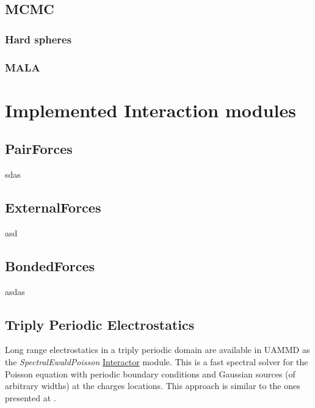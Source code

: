\documentclass[ twoside,openright,titlepage,numbers=noenddot,%
headinclude,footinclude,cleardoublepage=empty,abstract=on,
BCOR=5mm,paper=a4,fontsize=11pt
]{scrreprt}
\begin{document}
\chapter{MCMC}

\section{Hard spheres}

\section{MALA}

\newpage
\part{Implemented Interaction modules}\label{pt:interactors}
\cleardoublepage
\chapter{PairForces}

sdas


\chapter{ExternalForces}

asd

\chapter{BondedForces}

asdas


\chapter{Triply Periodic Electrostatics} \label{ch:tppoisson}

Long range electrostatics in a triply periodic domain are available in \gls{UAMMD} as the \emph{SpectralEwaldPoisson} \hyperref[sec:interactor]{Interactor} module.  
This is a fast spectral solver for the Poisson equation with periodic boundary conditions and Gaussian sources (of arbitrary widths) at the charges locations. This approach is similar to the ones presented at \cite{sepois1,sepois2, sepois3}.
\end{document}
